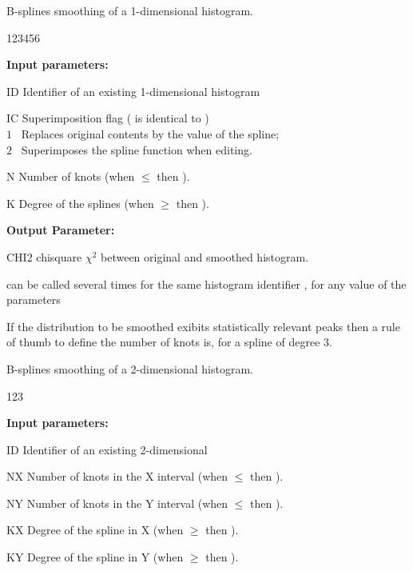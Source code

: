  
\Action
B-splines smoothing of a 1-dimensional histogram.
 
\begin{DLtt}{123456}
\item[{\rm\bf Input parameters:}]
\item[ID] Identifier of an existing 1-dimensional histogram
\item[IC] Superimposition flag ( is identical to )\\
$1$ \  Replaces original contents by the value of the spline;\\
$2$ \  Superimposes the spline function when editing.
\item[N] Number of knots (when \(\le\) then ).
\item[K] Degree of the splines (when \(\ge\) then ).
\item[{\rm\bf Output Parameter:}]
\item[CHI2] chisquare $\chi^2$ between original and smoothed histogram.
\end{DLtt}
 
\Remarks
\begin{UL}
\item {} can be called several times for the same
histogram identifier , for any value of the parameters
\item If the distribution to be smoothed exibits 
statistically relevant peaks then a rule of thumb to define the
number of knots is,  for a spline of degree $3$.
\end{UL}
 
\newpage%

 
\Action
B-splines smoothing of a 2-dimensional histogram.
 
\begin{DLtt}{123}
\item[{\rm\bf Input parameters:}]
\item[ID] Identifier of an existing 2-dimensional
\item[NX] Number of knots in the X interval (when \(\le\) then ).
\item[NY] Number of knots in the Y interval (when \(\le\) then ).
\item[KX] Degree of the spline in X (when \(\ge\)
 then ).
\item[KY] Degree of the spline in Y (when \(\ge\)
 then ).
\end{DLtt}
 
